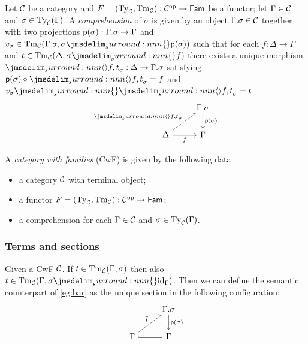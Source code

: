 \documentclass[a4paper]{article}
\begin{document}
\begin{definition}
  Let $\mathcal{C}$ be a category and $F = (\operatorname{Ty}_{\mathcal{C}},\operatorname{Tm}_{\mathcal{C}}) : \mathcal{C}^{\mathrm{op}} \to \mathsf{Fam}$ be a functor; let $\Gamma \in \mathcal{C}$ and $\sigma \in \operatorname{Ty}_{\mathcal{C}}(\Gamma)$.
  A \emph{comprehension} of $\sigma$ is given by an object $\Gamma.\sigma \in \mathcal{C}$ together with two projections $\operatorname{\mathsf{p}}(\sigma) : \Gamma.\sigma \to \Gamma$ and $v_{\sigma} \in \Tm{\cC}(\Gamma.\sigma, \semSubst{\sigma}{\ctxExt(\sigma)})$ such that for each $f : \Delta \to \Gamma$ and $t \in \Tm{\cC}(\Delta,\semSubst{\sigma}{f})$ there exists a unique morphism $\semComp{f}{t}{\sigma} : \Delta \to \Gamma.\sigma$ satisfying $\ctxExt(\sigma) \circ \semComp{f}{t}{\sigma} = f$ and $\semSubst{v_{\sigma}}{\semComp{f}{t}{\sigma}} = t$.
  \[\begin{tikzcd}
      & {\Gamma.\sigma} \\
      \Delta & \Gamma
      \arrow["{\ctxExt(\sigma)}", from=1-2, to=2-2]
      \arrow["{\semComp{f}{t}{\sigma}}", dashed, from=2-1, to=1-2]
      \arrow["f"', from=2-1, to=2-2]
    \end{tikzcd}\]
\end{definition}

\begin{definition}
  A \emph{category with families} (CwF) is given by the following data:
  \begin{itemize}
  \item a category $\mathcal{C}$ with terminal object;
  \item a functor $F = (\operatorname{Ty}_{\mathcal{C}},\operatorname{Tm}_{\mathcal{C}}) : \mathcal{C}^{\mathrm{op}} \to \mathsf{Fam}$;
  \item a comprehension for each $\Gamma \in \mathcal{C}$ and $\sigma \in \operatorname{Ty}_{\mathcal{C}}(\Gamma)$.
  \end{itemize}
\end{definition}

\subsubsection{Terms and sections}\label{sec:tas}

Given a CwF $\mathcal{C}$.
If $t \in \operatorname{Tm}_{\mathcal{C}}(\Gamma,\sigma)$ then also $t \in \Tm{\cC}(\Gamma,\semSubst{\sigma}{\id{\Gamma}})$.
Then we can define the semantic counterpart of \cref{eg:bar} as the unique section in the following configuration:
\[\begin{tikzcd}
    & {\Gamma.\sigma} \\
    \Gamma & \Gamma
    \arrow["{\ctxExt(\sigma)}", from=1-2, to=2-2]
    \arrow["{\ctxSec{t}}", dashed, from=2-1, to=1-2]
    \arrow[equals, from=2-1, to=2-2]
  \end{tikzcd}\]
\end{document}
